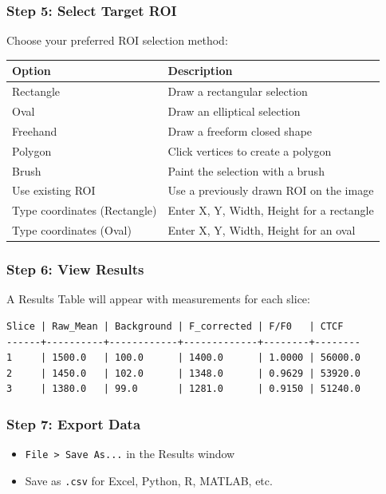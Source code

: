\documentclass[11pt,a4paper]{article}
\begin{document}
\subsubsection{Step 5: Select Target ROI}

Choose your preferred ROI selection method:

\begin{table}[h]
\centering
\begin{tabular}{@{}ll@{}}
\toprule
\textbf{Option} & \textbf{Description} \\
\midrule
Rectangle & Draw a rectangular selection \\
Oval & Draw an elliptical selection \\
Freehand & Draw a freeform closed shape \\
Polygon & Click vertices to create a polygon \\
Brush & Paint the selection with a brush \\
Use existing ROI & Use a previously drawn ROI on the image \\
Type coordinates (Rectangle) & Enter X, Y, Width, Height for a rectangle \\
Type coordinates (Oval) & Enter X, Y, Width, Height for an oval \\
\bottomrule
\end{tabular}
\end{table}

\subsubsection{Step 6: View Results}

A Results Table will appear with measurements for each slice:

\begin{lstlisting}[language={},numbers=none]
Slice | Raw_Mean | Background | F_corrected | F/F0   | CTCF
------+----------+------------+-------------+--------+--------
1     | 1500.0   | 100.0      | 1400.0      | 1.0000 | 56000.0
2     | 1450.0   | 102.0      | 1348.0      | 0.9629 | 53920.0
3     | 1380.0   | 99.0       | 1281.0      | 0.9150 | 51240.0
\end{lstlisting}

\subsubsection{Step 7: Export Data}

\begin{itemize}
    \item \texttt{File > Save As...} in the Results window
    \item Save as \texttt{.csv} for Excel, Python, R, MATLAB, etc.
\end{itemize}
\end{document}
